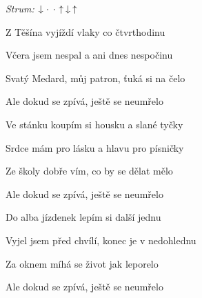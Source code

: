 \begin{song}


\begin{headerbox}
 \quad
\textit{Strum:} $\Down\Miss\Miss\Up\Down\Up$
\end{headerbox}

\begin{hchordbox}
\end{hchordbox}

\large

\bigskip

Z Těšína vyjíždí vlaky co čtvrthodinu    \par
{}Včera jsem nespal a ani dnes nespočinu   \par
{}Svatý Medard, můj patron, ťuká si na čelo \par
Ale dokud se zpívá, ještě se neumřelo    \par

\bigskip

Ve stánku koupím si housku a slané tyčky    \par
{}Srdce mám pro lásku a hlavu pro písničky    \par
{}Ze školy dobře vím, co by se dělat mělo \par
Ale dokud se zpívá, ještě se neumřelo    \par

\bigskip

Do alba jízdenek lepím si další jednu    \par
{}Vyjel jsem před chvílí, konec je v nedohlednu    \par
{}Za oknem míhá se život jak leporelo \par
Ale dokud se zpívá, ještě se neumřelo    \par

\bigskip


\end{song}
